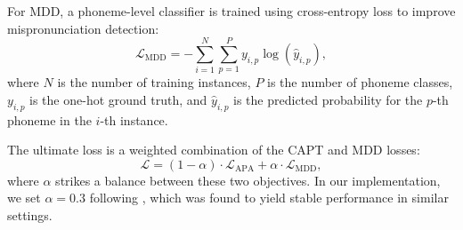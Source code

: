 \documentclass{Interspeech}
\begin{document}
For MDD, a phoneme-level classifier is trained using cross-entropy loss to improve mispronunciation detection:
\begin{equation}
\mathcal{L}_{\text{MDD}} = -\sum_{i=1}^{N} \sum_{p=1}^{P} y_{i,p} \log(\hat{y}_{i,p})
\label{eq:loss_mdd},
\end{equation}
where $N$ is the number of training instances, $P$ is the number of phoneme classes, $y_{i,p}$ is the one-hot ground truth, and $\hat{y}_{i,p}$ is the predicted probability for the $p$-th phoneme in the $i$-th instance.

The ultimate loss is a weighted combination of the CAPT and MDD losses:
\begin{equation}
\mathcal{L} = (1 - \alpha) \cdot \mathcal{L}_{\text{APA}} + \alpha \cdot \mathcal{L}_{\text{MDD}}
\label{eq:loss_total},
\end{equation}
where $\alpha$ strikes a balance between these two objectives. In our implementation, we set $\alpha = 0.3$ following \cite{he2024jam}, which was found to yield stable performance in similar settings.




\begin{table}[t]
\centering
\small
\setlength{\tabcolsep}{5pt}
\renewcommand{\arraystretch}{1.2}
\caption{Ablation Studies of the proposed method on automatic pronunciation assessment.}
\label{abalation_APA}
\end{table}
\end{document}
